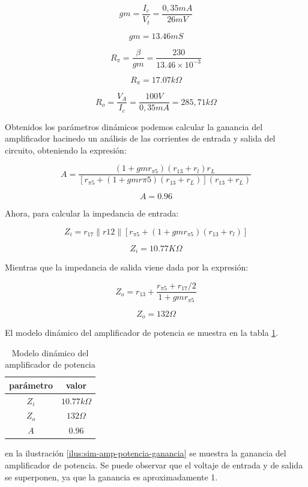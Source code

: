 $$gm = \frac{I_c}{V_t} = \frac{0,35 mA}{26 mV}$$

$$gm = 13.46 mS$$

$$R_\pi = \frac{\beta}{gm} = \frac{230}{13.46\times 10^{-3}}$$

$$ R_\pi = 17.07k \Omega$$

$$ R_o = \frac{V_A}{I_c} = \frac{100 V}{0,35 mA} = 285,71 k\Omega$$

Obtenidos los parámetros dinámicos podemos calcular la ganancia del amplificador hacinedo un análisis de las corrientes de entrada y salida del circuito, obteniendo la expresión:

 $$ A = \frac{(1 + gmr_{\pi5})(r_{13} + r_l)r_L}{[r_{\pi 5} + (1 + gmr\pi5)(r_{13} + r_L)](r_{13} + r_L)}$$

 $$A = 0.96 $$

 Ahora, para calcular la impedancia de entrada:

 $$ Z_i = r_{17} \parallel r{12} \parallel [r_{\pi5} + (1 + gmr_{\pi 5})(r_{13} + r_l)] $$
 
 $$ Z_i = 10.77K\Omega $$

 Mientras que la impedancia de salida viene dada por la expresión:

$$ Z_o = r_{13} + \frac{r_{\pi5} + r_{17}/2}{1 + gmr_{\pi5}} $$

 $$ Z_o = 132 \Omega$$

 El modelo dinámico del amplificador de potencia se muestra en la tabla \ref{tab:met-amp-potencia-modelo-dinamico}.

\begin{table}[ht]
    \centering
    \begin{tabular}{|c|c|}
        \hline
        parámetro & valor  \\
        \hline
        $Z_i$ & $10.77k\Omega$ \\
        \hline
        $Z_o$ & $132\Omega$ \\
        \hline
        $A$ & $0.96$ \\
        \hline
    \end{tabular}
    \caption{Modelo dinámico del amplificador de potencia}
    \label{tab:met-amp-potencia-modelo-dinamico}
\end{table}

en la ilustración \ref{ilus:sim-amp-potencia-ganancia} se muestra la ganancia del amplificador de potencia. Se puede observar que el voltaje de entrada y de salida se superponen, ya que la ganancia es aproximadamente 1.

